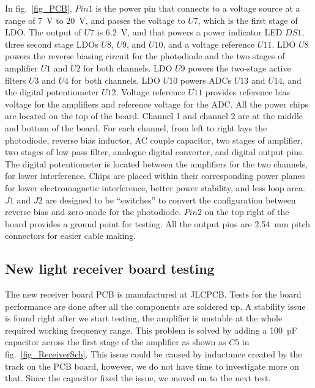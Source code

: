 In fig.~\ref{fig_PCB}, $Pin1$ is the power pin that connects to a voltage source at a range of \qty{7}{V} to \qty{20}{V}, and passes the voltage to $U7$, which is the first stage of LDO.  The output of $U7$ is \qty{6.2}{V}, and that powers a power indicator LED $DS1$, three second stage LDOs $U8$, $U9$, and $U10$, and a voltage reference $U11$.  LDO $U8$ powers the reverse biasing circuit for the photodiode and the two stages of amplifier $U1$ and $U2$ for both channels.  LDO $U9$ powers the two-stage active filters $U3$ and $U4$ for both channels.  LDO $U10$ powers ADCs $U13$ and $U14$, and the digital potentiometer $U12$.  Voltage reference $U11$ provides reference bias voltage for the amplifiers and reference voltage for the ADC.  All the power chips are located on the top of the board.  Channel 1 and channel 2 are at the middle and bottom of the board.  For each channel, from left to right lays the photodiode, reverse bias inductor, AC couple capacitor, two stages of amplifier, two stages of low pass filter, analogue digital converter, and digital output pins.  The digital potentiometer is located between the amplifiers for the two channels, for lower interference.  Chips are placed within their corresponding power planes for lower electromagnetic interference, better power stability, and less loop area.  $J1$ and $J2$ are designed to be ``switches'' to convert the configuration between reverse bias and zero-mode for the photodiode.  $Pin2$ on the top right of the board provides a ground point for testing.  All the output pins are \qty{2.54}{mm} pitch connectors for easier cable making.


\subsection{New light receiver board testing}

The new receiver board PCB is manufactured at JLCPCB.  Tests for the board performance are done after all the components are soldered up.  A stability issue is found right after we start testing, the amplifier is unstable at the whole required working frequency range.   This problem is solved by adding a \qty{100}{pF} capacitor across the first stage of the amplifier as shown as $C5$ in fig.~\ref{fig_ReceiverSch}.  This issue could be caused by inductance created by the track on the PCB board, however, we do not have time to investigate more on that.  Since the capacitor fixed the issue, we moved on to the next test.

